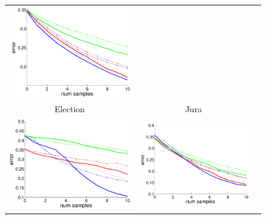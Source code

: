 \documentclass{article}
\begin{document}
\begin{figure}[h!]
{\begin{tabular}{ccc}
\includegraphics[scale=0.3]{figs/error_movieLensDataLargeScale.pdf}\\
Election&
Jura&
\\
\includegraphics[scale=0.3]{figs/error_electionDataLargeScale.pdf}&
\includegraphics[scale=0.3]{figs/error_juraDataLargeScale.pdf}&

\end{tabular}}
\end{figure}
\end{document}

